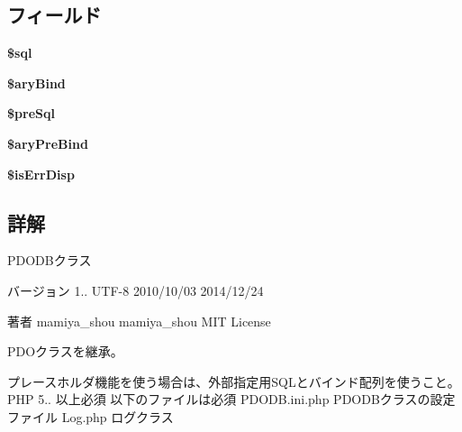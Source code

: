 \subsection*{フィールド}
\begin{DoxyCompactItemize}
\item 
\hypertarget{class_p_d_o_d_b_a047170d6020a882807665812a27e2525}{{\bfseries \$sql}}\label{class_p_d_o_d_b_a047170d6020a882807665812a27e2525}

\item 
\hypertarget{class_p_d_o_d_b_a139dfb0d4211dd1706570778a5a9d692}{{\bfseries \$ary\+Bind}}\label{class_p_d_o_d_b_a139dfb0d4211dd1706570778a5a9d692}

\item 
\hypertarget{class_p_d_o_d_b_aa9c41fca31d8871ad2fe81c45a5963a5}{{\bfseries \$pre\+Sql}}\label{class_p_d_o_d_b_aa9c41fca31d8871ad2fe81c45a5963a5}

\item 
\hypertarget{class_p_d_o_d_b_abb05cef0bb5ac558ae5211a3c419e2fc}{{\bfseries \$ary\+Pre\+Bind}}\label{class_p_d_o_d_b_abb05cef0bb5ac558ae5211a3c419e2fc}

\item 
\hypertarget{class_p_d_o_d_b_a6b7e8055dba3b29240adc7b8b7f22bba}{{\bfseries \$is\+Err\+Disp}}\label{class_p_d_o_d_b_a6b7e8055dba3b29240adc7b8b7f22bba}

\end{DoxyCompactItemize}


\subsection{詳解}
P\+D\+O\+D\+Bクラス

\begin{DoxyVersion}{バージョン}
1..  U\+T\+F-\/8  2010/10/03  2014/12/24 
\end{DoxyVersion}
\begin{DoxyAuthor}{著者}
mamiya\+\_\+shou  mamiya\+\_\+shou  M\+I\+T License 
\begin{DoxyItemize}
\item P\+D\+Oクラスを継承。
\item プレースホルダ機能を使う場合は、外部指定用\+S\+Q\+Lとバインド配列を使うこと。  P\+H\+P 5.. 以上必須 以下のファイルは必須 P\+D\+O\+D\+B.\+ini.\+php P\+D\+O\+D\+Bクラスの設定ファイル Log.\+php ログクラス 
\end{DoxyItemize}
\end{DoxyAuthor}


